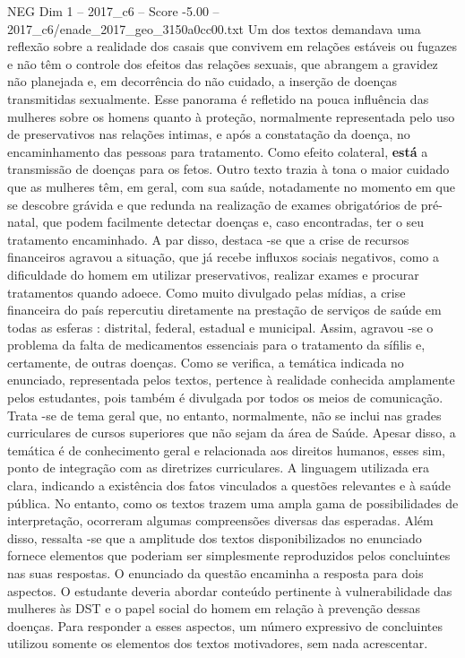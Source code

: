 \begin{textsample}{NEG Dim 1 – 2017\_c6 – Score -5.00 – 2017\_c6/enade\_2017\_geo\_3150a0cc00.txt}
Um dos textos demandava uma reflexão sobre a realidade dos casais que convivem em relações estáveis ou fugazes e não têm o controle dos efeitos das relações sexuais, que abrangem a gravidez não planejada e, em decorrência do não cuidado, a inserção de doenças transmitidas sexualmente.
Esse panorama é refletido na pouca influência das mulheres sobre os homens quanto à proteção, normalmente representada pelo uso de preservativos nas relações intimas, e após a constatação da doença, no encaminhamento das pessoas para tratamento.
Como efeito colateral, \textbf{está} a transmissão de doenças para os fetos.
Outro texto trazia à tona o maior cuidado que as mulheres têm, em geral, com sua saúde, notadamente no momento em que se descobre grávida e que redunda na realização de exames obrigatórios de pré-natal, que podem facilmente detectar doenças e, caso encontradas, ter o seu tratamento encaminhado.
A par disso, destaca -se que a crise de recursos financeiros agravou a situação, que já recebe influxos sociais negativos, como a dificuldade do homem em utilizar preservativos, realizar exames e procurar tratamentos quando adoece.
Como muito divulgado pelas mídias, a crise financeira do país repercutiu diretamente na prestação de serviços de saúde em todas as esferas : distrital, federal, estadual e municipal.
Assim, agravou -se o problema da falta de medicamentos essenciais para o tratamento da sífilis e, certamente, de outras doenças.
Como se verifica, a temática indicada no enunciado, representada pelos textos, pertence à realidade conhecida amplamente pelos estudantes, pois também é divulgada por todos os meios de comunicação.
Trata -se de tema geral que, no entanto, normalmente, não se inclui nas grades curriculares de cursos superiores que não sejam da área de Saúde.
Apesar disso, a temática é de conhecimento geral e relacionada aos direitos humanos, esses sim, ponto de integração com as diretrizes curriculares.
A linguagem utilizada era clara, indicando a existência dos fatos vinculados a questões relevantes e à saúde pública.
No entanto, como os textos trazem uma ampla gama de possibilidades de interpretação, ocorreram algumas compreensões diversas das esperadas.
Além disso, ressalta -se que a amplitude dos textos disponibilizados no enunciado fornece elementos que poderiam ser simplesmente reproduzidos pelos concluintes nas suas respostas.
O enunciado da questão encaminha a resposta para dois aspectos.
O estudante deveria abordar conteúdo pertinente à vulnerabilidade das mulheres às DST e o papel social do homem em relação à prevenção dessas doenças.
Para responder a esses aspectos, um número expressivo de concluintes utilizou somente os elementos dos textos motivadores, sem nada acrescentar.

\end{textsample}

